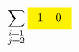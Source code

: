 \documentclass{article}
\begin{document}
\[ \sum_{\substack{i=1\\ j=2}}
\colorbox{yellow}{$\begin{array}{cc}1 &0\end{array}$} \]
\end{document}
